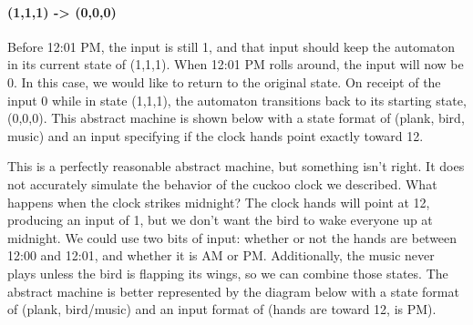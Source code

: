 \paragraph{(1,1,1) -> (0,0,0)} Before 12:01 PM, the input is still 1, and that input should keep the automaton in its current state of (1,1,1). When 12:01 PM rolls around, the input will now be 0. In this case, we would like to return to the original state. On receipt of the input 0 while in state (1,1,1), the automaton transitions back to its starting state, (0,0,0). This abstract machine is shown below with a state format of (plank, bird, music) and an input specifying if the clock hands point exactly toward 12.

\begin{center}
\end{center}
\vspace{5mm}

This is a perfectly reasonable abstract machine, but something isn't right. It does not accurately simulate the behavior of the cuckoo clock we described. What happens when the clock strikes midnight? The clock hands will point at 12, producing an input of 1, but we don't want the bird to wake everyone up at midnight. We could use two bits of input: whether or not the hands are between 12:00 and 12:01, and whether it is AM or PM. Additionally, the music never plays unless the bird is flapping its wings, so we can combine those states. The abstract machine is better represented by the diagram below with a state format of (plank, bird/music) and an input format of (hands are toward 12, is PM).

